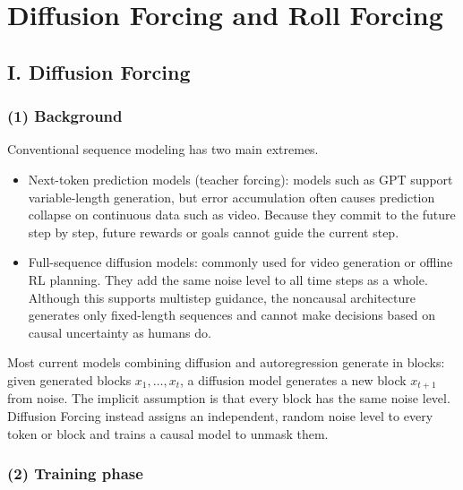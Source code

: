 \setcounter{section}{4}

\hypertarget{diffusion-forcing-and-roll-forcing}{%
\section{Diffusion Forcing and Roll Forcing}\label{diffusion-forcing-and-roll-forcing}}

\hypertarget{i.-diffusion-forcing}{%
\subsection{I. Diffusion Forcing}\label{i.-diffusion-forcing}}

\hypertarget{background}{%
\subsubsection{(1) Background}\label{background}}

Conventional sequence modeling has two main extremes.

\begin{itemize}
\tightlist
\item
  Next-token prediction models (teacher forcing): models such as GPT support variable-length generation, but error accumulation often causes prediction collapse on continuous data such as video. Because they commit to the future step by step, future rewards or goals cannot guide the current step.
\item
  Full-sequence diffusion models: commonly used for video generation or offline RL planning. They add the same noise level to all time steps as a whole. Although this supports multistep guidance, the noncausal architecture generates only fixed-length sequences and cannot make decisions based on causal uncertainty as humans do.
\end{itemize}

Most current models combining diffusion and autoregression generate in blocks: given generated blocks \(x_1,\ldots,x_t\), a diffusion model generates a new block \(x_{t+1}\) from noise. The implicit assumption is that every block has the same noise level. Diffusion Forcing instead assigns an independent, random noise level to every token or block and trains a causal model to unmask them.

\hypertarget{training-phase}{%
\subsubsection{(2) Training phase}\label{training-phase}}

